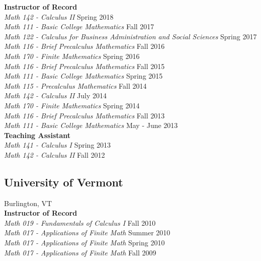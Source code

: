 \documentclass{article}
\begin{document}
  \noindent\textbf{Instructor of Record}\\
  \textsl{Math 142 - Calculus II} \hfill Spring 2018\\
  \textsl{Math 111 - Basic College Mathematics} \hfill Fall 2017\\
  \textsl{Math 122 - Calculus for Business Administration and Social Sciences} \hfill Spring 2017\\
  \textsl{Math 116 - Brief Precalculus Mathematics} \hfill Fall 2016\\
  \textsl{Math 170 - Finite Mathematics} \hfill Spring 2016\\
  \textsl{Math 116 - Brief Precalculus Mathematics} \hfill Fall 2015\\
  \textsl{Math 111 - Basic College Mathematics} \hfill Spring 2015\\
  \textsl{Math 115 - Precalculus Mathematics} \hfill Fall 2014\\
  \textsl{Math 142 - Calculus II} \hfill July 2014\\
  \textsl{Math 170 - Finite Mathematics} \hfill Spring 2014\\
  \textsl{Math 116 - Brief Precalculus Mathematics} \hfill Fall 2013\\
  \textsl{Math 111 - Basic College Mathematics} \hfill May - June 2013\\

  \noindent\textbf{Teaching Assistant}\\
  \textsl{Math 141 - Calculus I} \hfill Spring 2013\\
  \textsl{Math 142 - Calculus II} \hfill Fall 2012\\

  \subsection*{University of Vermont}
  \noindent Burlington, VT\\
  
  \noindent\textbf{Instructor of Record}\\
  \textsl{Math 019 - Fundamentals of Calculus I} \hfill Fall 2010\\
  \textsl{Math 017 - Applications of Finite Math} \hfill Summer 2010\\
  \textsl{Math 017 - Applications of Finite Math} \hfill Spring 2010\\
  \textsl{Math 017 - Applications of Finite Math} \hfill Fall 2009\\
  
\end{document}
